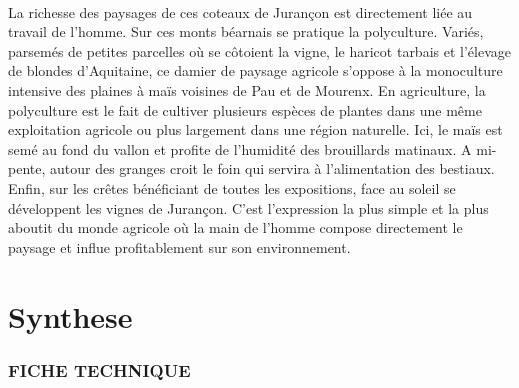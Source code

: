\documentclass[titlepage]{article}
\begin{document}
        \paragraph{}
        La richesse des paysages de ces coteaux de Jurançon est directement liée au travail de l'homme. Sur ces monts béarnais se pratique la polyculture. Variés, parsemés de petites parcelles où se côtoient la vigne, le haricot tarbais et l'élevage de blondes d'Aquitaine, ce damier de paysage agricole s'oppose à la monoculture intensive des plaines à maïs voisines de Pau et de Mourenx. En agriculture, la polyculture est le fait de cultiver plusieurs espèces de plantes dans une même exploitation agricole ou plus largement dans une région naturelle. Ici, le maïs est semé au fond du vallon et profite de l'humidité des brouillards matinaux. A mi-pente, autour des granges croit le foin qui servira à l'alimentation des bestiaux. Enfin, sur les crêtes bénéficiant de toutes les expositions, face au soleil se développent les vignes de Jurançon. C'est l'expression la plus simple et la plus aboutit du monde agricole où la main de l'homme compose directement le paysage et influe profitablement sur son environnement.
        \section{Synthese}
        
        \subsubsection{FICHE TECHNIQUE}
    
\end{document}
